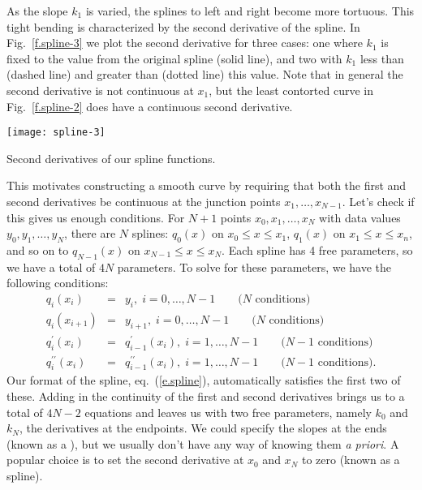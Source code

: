 As the slope $k_{1}$ is varied, the splines to left and right become more tortuous. This tight bending is characterized by the second derivative of the spline. In Fig.~\ref{f.spline-3} we plot the second derivative for three cases: one where $k_{1}$ is fixed to the value from the original spline (solid line), and two with $k_{1}$ less than (dashed line) and greater than (dotted line) this value. Note that in general the second derivative is not continuous at $x_{1}$, but the least contorted curve in Fig.~\ref{f.spline-2} does have a continuous second derivative.

\begin{marginfigure}
\texttt{[image: spline-3]}
\caption{\label{f.spline-3} Second derivatives of our spline functions.}
\end{marginfigure}

This motivates constructing a smooth curve by requiring that both the first and second derivatives be continuous at the junction points $x_{1},\ldots,x_{N-1}$. Let's check if this gives us enough conditions. For $N+1$ points $x_{0},x_{1},\ldots,x_{N}$ with data values $y_{0},y_{1},\ldots,y_{N}$, there are $N$ splines: $q_{0}(x)$ on $x_{0}\le x\le x_{1}$, $q_{1}(x)$ on $x_{1}\le x \le x_{n}$, and so on to $q_{N-1}(x)$ on $x_{N-1}\le x\le x_{N}$. Each spline has 4 free parameters, so we have a total of $4N$ parameters. To solve for these parameters, we have the following conditions:
\begin{eqnarray*}
q_{i}(x_{i}) &=& y_{i},\;i=0,\ldots,N-1\qquad\textrm{($N$ conditions)}\\
q_{i}(x_{i+1}) &=& y_{i+1},\;i=0,\ldots,N-1\qquad\textrm{($N$ conditions)}\\
q^{\prime}_{i}(x_{i}) &=& q^{\prime}_{i-1}(x_{i}),\;i=1,\ldots,N-1\qquad\textrm{($N-1$ conditions)}\\
q^{\prime\prime}_{i}(x_{i}) &=& q^{\prime\prime}_{i-1}(x_{i}),\;i=1,\ldots,N-1\qquad\textrm{($N-1$ conditions)}.
\end{eqnarray*}
Our format of the spline, eq.~(\ref{e.spline}), automatically satisfies the first two of these. Adding in the continuity of the first and second derivatives brings us to a total of $4N-2$ equations and leaves us with two free parameters, namely $k_{0}$ and $k_{N}$, the derivatives at the endpoints. We could specify the slopes at the ends (known as a ), but we usually don't have any way of knowing them \emph{a priori}. A popular choice is to set the second derivative at $x_{0}$ and $x_{N}$ to zero (known as a  spline).

